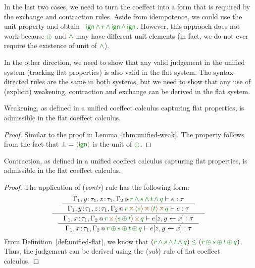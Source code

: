\noindent
In the last two cases, we need to turn the coeffect into a form that is required by the exchange
and contraction rules. Aside from idempotence, we could use the unit property and obtain 
\eg~$\czero\,\czip\,\cclrd{r}\,\czip\,\czero\,\czip\,\czero$. However, this appraoch does not 
work because $\cpar$ and $\czip$ may have different unit elements (in fact, we do not ever require
the existence of unit of $\czip$).

In the other direction, we need to show that any valid judgement in the unified system (tracking
flat properties) is also valid in the flat system. The syntax-directed rules are the same in both
systems, but we need to show that any use of (explicit) weakening, contraction and exchange can be
derived in the flat system. 

\begin{lemma}
Weakening, as defined in a unified coeffect calculus capturing flat properties, is admissible in 
the flat coeffect calculus.
\end{lemma}
\begin{proof}
Similar to the proof in Lemma~\ref{thm:unified-weak}. The property follows from the fact that 
$\bot=\alift{\czero}$ is the unit of $\cpar$.
\end{proof}

\begin{lemma}
\label{thm:unified-rev-contr}
Contraction, as defined in a unified coeffect calculus capturing flat properties, is admissible in 
the flat coeffect calculus.
\end{lemma}
\begin{proof}
The application of (\emph{contr}) rule has the following form:
\begin{equation*}
\inference
 { \inference
    {\coctx{\Gamma_1,y\!:\!\tau_1,z\!:\!\tau_1,\Gamma_2}{\cclrd{r} \,\czip\, \cclrd{s} \,\czip\, \cclrd{t} \,\czip\, \cclrd{q}} \vdash e : \tau}
    {\coctx{\Gamma_1,y\!:\!\tau_1,z\!:\!\tau_1,\Gamma_2}{\cclrd{r} \,\azip\, \alift{\cclrd{s}} \,\azip\, \alift{\cclrd{t}} \,\azip\, \cclrd{q}} \vdash e : \tau} }
 { \inference
    {\coctx{\Gamma_1,x\!:\!\tau_1,\Gamma_2}{\cclrd{r} \,\apar\, \alift{\cclrd{s} \,\cpar\, \cclrd{t}} \,\apar\, \cclrd{q}} \vdash \subst{e}{z,y}{x} : \tau}
    {\coctx{\Gamma_1,x\!:\!\tau_1,\Gamma_2}{\cclrd{r} \,\cpar\, \cclrd{s} \,\cpar\, \cclrd{t} \,\cpar\, \cclrd{q}} \vdash \subst{e}{z,y}{x} : \tau} } 
\end{equation*}
%
From Definition~\ref{def:unified-flat}, we know that $(\cclrd{r} \,\czip\, \cclrd{s} \,\czip\, \cclrd{t} \,\czip\, \cclrd{q}) 
\;\cleq\; (\cclrd{r} \,\cpar\, \cclrd{s} \,\cpar\, \cclrd{t} \,\cpar\, \cclrd{q})$. Thus, the judgement
 can be derived using the (\emph{sub}) rule of flat coeffect calculus.
\end{proof}


